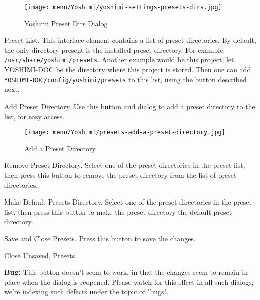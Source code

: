    \setcounter{ItemCounter}{0}      %

\begin{figure}[H]
   \centering 
   \texttt{[image: menu/Yoshimi/yoshimi-settings-presets-dirs.jpg]}
   \caption[Preset Dirs Tab]{Yoshimi Preset Dirs Dialog}
   \label{fig:yoshimi_presets_dirs_tab}
\end{figure}

   \setcounter{ItemCounter}{0}      %

   Preset List.
   This interface element contains a list of preset directories.
   By default, the only directory present is the installed preset directory.
   For example, \texttt{/usr/share/yoshimi/presets}.
   Another example would be this project; let YOSHIMI-DOC be the directory
   where this project is stored.  Then one can add
   \texttt{YOSHIMI-DOC/config/yoshimi/presets} to this list, using the
   button described next.

   Add Preset Directory.
   Use this button and dialog to add a preset directory to the list, for
   easy access.

\begin{figure}[H]
   \centering 
   \texttt{[image: menu/Yoshimi/presets-add-a-preset-directory.jpg]}
   \caption[Add Preset Directory]{Add a Preset Directory}
   \label{fig:presets_add_a_preset_directory}
\end{figure}

   Remove Preset Directory.
   Select one of the preset directories in the preset list, then press this
   button to remove the preset directory from the list of preset
   directories.

   Make Default Presets Directory.
   Select one of the preset directories in the preset list, then press this
   button to make the preset directory the default preset directory.

   Save and Close Presets.
   Press this button to save the changes.

   Close Unsaved, Presets.
   
   \textbf{Bug:}
   This button doesn't seem to work, in that the changes seem to remain
   in place when the dialog is reopened.
   Please watch for this effect in all such dialogs; we're indexing such
   defects under the topic of "bugs".

